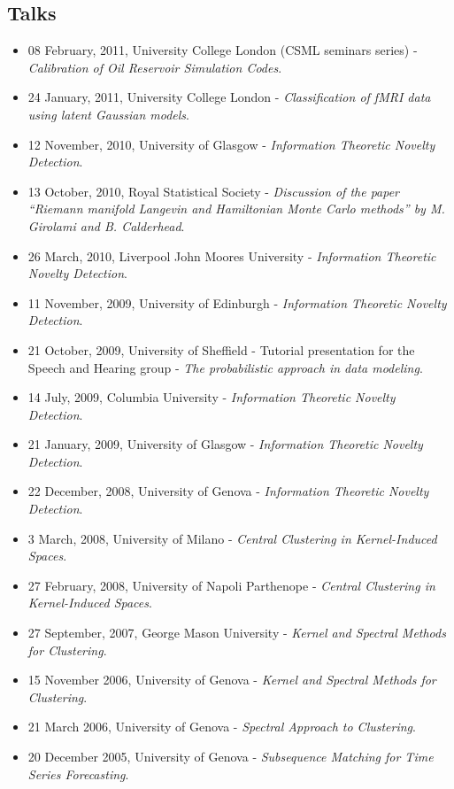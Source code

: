 \documentclass[a4paper,10pt]{article}
\begin{document}
\subsection*{Talks}
\begin{itemize}
\item 08 February, 2011, University College London (CSML seminars series) - \emph{Calibration of Oil Reservoir Simulation Codes}.
\item 24 January, 2011, University College London - \emph{Classification of fMRI data using latent Gaussian models}.
\item 12 November, 2010, University of Glasgow - \emph{Information Theoretic Novelty Detection}.
\item 13 October, 2010, Royal Statistical Society - \emph{Discussion of the paper ``Riemann manifold Langevin and Hamiltonian Monte Carlo methods'' by M. Girolami and B. Calderhead}.
\item 26 March, 2010, Liverpool John Moores University - \emph{Information Theoretic Novelty Detection}.
\item 11 November, 2009, University of Edinburgh - \emph{Information Theoretic Novelty Detection}.
\item 21 October, 2009, University of Sheffield - Tutorial presentation for the Speech and Hearing group - \emph{The probabilistic approach in data modeling}.
\item 14 July, 2009, Columbia University - \emph{Information Theoretic Novelty Detection}.
\item 21 January, 2009, University of Glasgow - \emph{Information Theoretic Novelty Detection}.
\item 22 December, 2008, University of Genova - \emph{Information Theoretic Novelty Detection}.
\item 3 March, 2008, University of Milano - \emph{Central Clustering in Kernel-Induced Spaces}.
\item 27 February, 2008, University of Napoli Parthenope - \emph{Central Clustering in Kernel-Induced Spaces}.
\item 27 September, 2007, George Mason University - \emph{Kernel and Spectral Methods for Clustering}.
\item 15 November 2006, University of Genova - \emph{Kernel and Spectral Methods for Clustering}.
\item 21 March 2006, University of Genova - \emph{Spectral Approach to Clustering}.
\item 20 December 2005, University of Genova - \emph{Subsequence Matching for Time Series Forecasting}.
\end{itemize}
\end{document}
